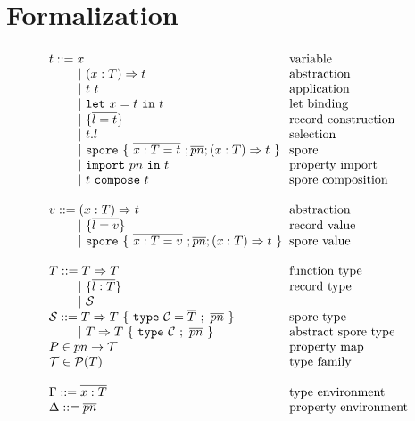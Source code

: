 \documentclass[runningheads]{llncs}
\newcommand{\seq}[1]{\overline{#1}}
\newcommand{\ba}{\begin{array}}
\newcommand{\ea}{\end{array}}
\newcommand{\gap}{\quad\quad}
\begin{document}
\begin{sloppypar}
\section{Formalization}


\label{sec:formal}

\begin{figure}[ht!]
  \centering

  $\ba[t]{l@{\hspace{2mm}}l}
t ::=     x                                 & \mbox{variable}
\\
\gap ~|~  (x: T) \Rightarrow t              & \mbox{abstraction}
\\
\gap ~|~  t~t                               & \mbox{application}
\\
\gap ~|~  \texttt{let}~x = t~\texttt{in}~t  & \mbox{let binding}
\\
\gap ~|~  \{ \seq{l = t} \}                 & \mbox{record construction}
\\
\gap ~|~  t.l                               & \mbox{selection}
\\
\gap ~|~  \texttt{spore}~\{~\seq{x : T = t}~; \seq{pn} ; (x: T) \Rightarrow t~\}  & \mbox{spore}
\\
\gap ~|~  \texttt{import}~pn~\texttt{in}~t  & \mbox{property import}
\\
\gap ~|~  t~\texttt{compose}~t              & \mbox{spore composition}
\\
 & \\
v ::=     (x: T) \Rightarrow t              & \mbox{abstraction}
\\
\gap ~|~  \{ \seq{l = v} \}                 & \mbox{record value}
\\
\gap ~|~  \texttt{spore}~\{~\seq{x : T = v}~; \seq{pn} ; (x: T) \Rightarrow t~\}  & \mbox{spore value}
\\
 & \\
T ::=     T \Rightarrow T                   & \mbox{function type} \\
\gap ~|~  \{ \seq{l : T} \}                 & \mbox{record type}   \\
\gap ~|~  \mathcal{S}                       & \mbox{}
\\
\mathcal{S} ::= T \Rightarrow T~\{~\texttt{type}~\mathcal{C} = \seq{T}~;~\seq{pn}~\}   & \mbox{spore type}
\\
\gap ~|~  T \Rightarrow T~\{~\texttt{type}~\mathcal{C}~;~\seq{pn}~\}   & \mbox{abstract spore type}
\\
P \in pn \rightarrow \mathcal{T} & \mbox {property map}
\\
\mathcal{T} \in \mathcal{P}(T)   & \mbox{type family}
\\
 & \\
\Gamma ::=  \seq{x : T}          & \mbox{type environment}
\\
\Delta ::=  \seq{pn}             & \mbox{property environment}
\\
\ea$


\end{figure}
\end{sloppypar}
\end{document}
